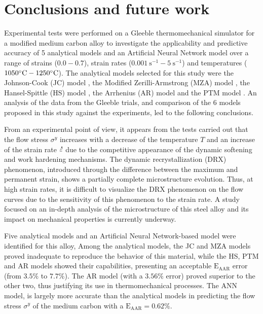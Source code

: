 \documentclass[twoside,english,1p,final,sort&compress]{elsarticle}
\theoremstyle{plain}
\DeclareRobustCommand{\mdot}[1]{\accentset{\mbox{\bfseries .}}{#1}}
\DeclareRobustCommand{\AARE}{\text{E}_\text{AAR}}
\DeclareRobustCommand{\ps}{\text{s}^{-1}}
\begin{document}
\section{Conclusions and future work\label{sec:Conclusion}}

Experimental tests were performed on a Gleeble thermomechanical simulator for a modified medium carbon alloy to investigate the applicability and predictive accuracy of 5 analytical models and an Artificial Neural Network model over a range of strains ($0.0-0.7$), strain rates ($0.001~\ps-5~\ps$) and temperatures ($1050\celsius-1250\celsius$).
The analytical models selected for this study were the Johnson-Cook (JC) model \cite{Johnson-1983}, the Modified Zerilli-Armstrong (MZA) model \cite{Samantaray-2009}, the Hansel-Spittle (HS) model \cite{Hensel-1978}, the Arrhenius (AR) model \cite{Sellars-1966} and the PTM model  \cite{TizeMha-2022}.
An analysis of the data from the Gleeble trials, and comparison of the 6 models proposed in this study against the experiments, led to the following conclusions.

From an experimental point of view, it appears from the tests carried out that the flow stress $\sigma^y$ increases with a decrease of the temperature $T$ and an increase of the strain rate $\mdot\varepsilon$ due to the competitive appearance of the dynamic softening and work hardening mechanisms.
The dynamic recrystallization (DRX) phenomenon, introduced through the difference between the maximum and permanent strain, shows a partially complete microstructure evolution.
Thus, at high strain rates, it is difficult to visualize the DRX phenomenon on the flow curves due to the sensitivity of this phenomenon to the strain rate.
A study focused on an in-depth analysis of the microstructure of this steel alloy and its impact on mechanical properties is currently underway.

Five analytical models and an Artificial Neural Network-based model were identified for this alloy,
Among the analytical models, the JC and MZA models proved inadequate to reproduce the behavior of this material, while the HS, PTM and AR models showed their capabilities, presenting an acceptable $\AARE$ error (from $3.5\%$ to $7.7\%$). The AR model (with a $3.56\%$ error) proved superior to the other two, thus justifying its use in thermomechanical processes. The ANN model, is largely more accurate than the analytical models in predicting the flow stress $\sigma^y$ of the medium carbon with a $\AARE=0.62\%$.
\end{document}
